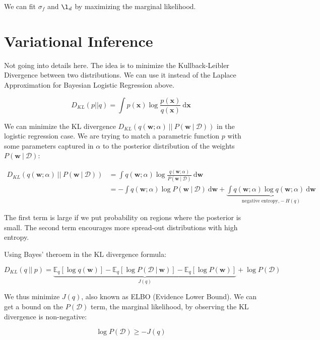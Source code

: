 \documentclass{article}
\newcommand{\vf}[1]{\mathbf{#1}}
\newcommand{\bx}{\vf{x}}
\newcommand{\bw}{\vf{w}}
\newcommand{\giv}{\ |\ }
\newcommand{\data}{\mathcal{D}}
\newcommand{\de}{\text{d}}
\newcommand{\expect}{\mathbb{E}}
\newcommand{\kl}{D_{KL}}
\newcommand{\post}{P(\bw \giv \data)}
\begin{document}
We can fit $\sigma_f$ and $\l_d$ by maximizing the marginal likelihood.

\section{Variational Inference}
Not going into details here. The idea is to minimize the Kullback-Leibler Divergence between two distributions. We can use it instead of the Laplace Approximation for Bayesian Logistic Regression above.

\begin{equation*}
    D_{KL}(p || q) = \int p(\bx) \log \frac{p(\bx)}{q(\bx)}\ \de\bx
\end{equation*}

We can minimize the KL divergence $D_{KL}(q(\bw; \alpha)\ ||\ P(\bw \giv \data))$ in the logistic regression case. We are trying to match a parametric function $p$ with some parameters captured in $\alpha$ to the posterior distribution of the weights $P(\bw \giv \data)$:

\begin{align*}
    \kl(q(\bw; \alpha)\ ||\ \post) &= \int q(\bw; \alpha) \log \frac{
        q(\bw; \alpha)
    }{
        \post
    }
    \ \de\bw \\
    &= -\int q(\bw; \alpha) \log \post\ \de\bw + 
    \underbrace{
        \int q(\bw; \alpha) \log q(\bw; \alpha)\ \de\bw
    }_{\text{negative entropy,} -H(q)}
\end{align*}

The first term is large if we put probability on regions where the posterior is small. The second term encourages more spread-out distributions with high entropy.
\vskip 0.1in

Using Bayes' theroem in the KL divergence formula:

\begin{equation*}
    \kl(q\ ||\ p) = \underbrace{
        \expect_q[\log q(\bw)] -
        \expect_q[\log P(\data \giv \bw)] -
        \expect_q[\log P(\bw)]
    }_{J(q)} + \log P(\data)
\end{equation*}

We thus minimize $J(q)$, also known as ELBO (Evidence Lower Bound). We can get a bound on the $P(\data)$ term, the marginal likelihood, by observing the KL divergence is non-negative:

\begin{equation*}
    \log P(\data) \geq -J(q)
\end{equation*}
\end{document}
